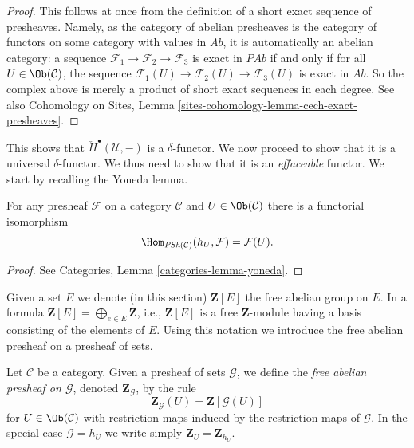 \begin{proof}
This follows at once from the definition of a short exact sequence of
presheaves. Namely, as the category of abelian presheaves is the category of
functors on some category with values in $\textit{Ab}$, it is automatically an
abelian category: a sequence $\mathcal{F}_1\to \mathcal{F}_2\to \mathcal{F}_3$
is exact in $\textit{PAb}$ if and only if for all
$U \in \Ob(\mathcal{C})$, the sequence
$\mathcal{F}_1(U) \to \mathcal{F}_2(U) \to \mathcal{F}_3(U)$ is exact in
$\textit{Ab}$. So the complex above is merely a product of short exact
sequences in each degree. See also
Cohomology on Sites, Lemma \ref{sites-cohomology-lemma-cech-exact-presheaves}.
\end{proof}

\noindent
This shows that $\check{H}^\bullet(\mathcal{U}, -)$ is a $\delta$-functor.
We now proceed to show that it is a universal $\delta$-functor. We thus need to
show that it is an {\it effaceable} functor. We start by recalling the Yoneda
lemma.

\begin{lemma}
\label{lemma-yoneda-presheaf}
For any presheaf $\mathcal{F}$ on a category $\mathcal{C}$
and $U \in \Ob(\mathcal{C})$ there is a functorial isomorphism
$$
\Hom_{\textit{PSh}(\mathcal{C})}(h_U, \mathcal{F}) =
\mathcal{F}(U).
$$
\end{lemma}

\begin{proof}
See Categories, Lemma \ref{categories-lemma-yoneda}.
\end{proof}

\noindent
Given a set $E$ we denote (in this section)
$\mathbf{Z}[E]$ the free abelian group on $E$. In a formula
$\mathbf{Z}[E] = \bigoplus_{e \in E} \mathbf{Z}$, i.e., $\mathbf{Z}[E]$ is
a free $\mathbf{Z}$-module having a basis consisting of the elements of $E$.
Using this notation we introduce the free abelian presheaf on a
presheaf of sets.

\begin{definition}
\label{definition-free-abelian-presheaf}
Let $\mathcal{C}$ be a category.
Given a presheaf of sets $\mathcal{G}$, we define the
{\it free abelian presheaf on $\mathcal{G}$},
denoted $\mathbf{Z}_\mathcal{G}$, by the rule
$$
\mathbf{Z}_\mathcal{G}(U)
=
\mathbf{Z}[\mathcal{G}(U)]
$$
for $U \in \Ob(\mathcal{C})$
with restriction maps induced by the restriction maps of $\mathcal{G}$.
In the special case $\mathcal{G} = h_U$ we write simply
$\mathbf{Z}_U = \mathbf{Z}_{h_U}$.
\end{definition}

